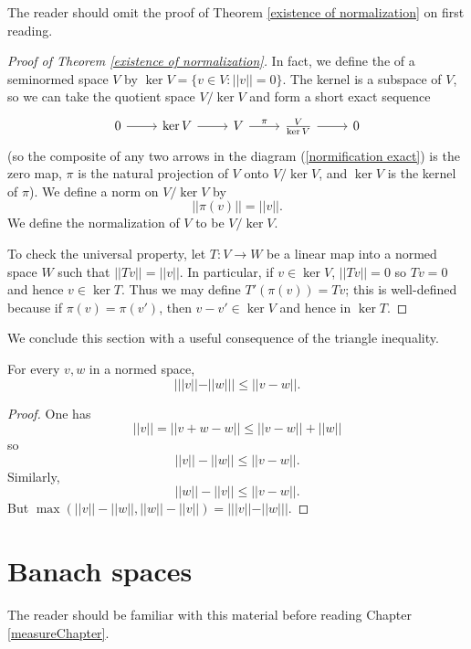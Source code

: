 The reader should omit the proof of Theorem \ref{existence of normalization} on first reading.
\begin{proof}[Proof of Theorem \ref{existence of normalization}]
In fact, we define the  of a seminormed space $V$ by $\ker V = \{v \in V: ||v|| = 0\}$.
The kernel is a subspace of $V$, so we can take the quotient space $V/\ker V$ and form a short exact sequence
\begin{equation}
\label{normification exact}
\begin{tikzcd}
0 \arrow[r] & \ker V \arrow[r] & V \arrow[r,"\pi"] & \frac{V}{\ker V} \arrow[r] & 0
\end{tikzcd}
\end{equation}
(so the composite of any two arrows in the diagram (\ref{normification exact}) is the zero map, $\pi$ is the natural projection of $V$ onto $V/\ker V$, and $\ker V$ is the kernel of $\pi$).
We define a norm on $V/\ker V$ by
$$||\pi(v)|| = ||v||.$$
We define the normalization of $V$ to be $V/\ker V$.

To check the universal property, let $T: V \to W$ be a linear map into a normed space $W$ such that $||Tv|| = ||v||$.
In particular, if $v \in \ker V$, $||Tv|| = 0$ so $Tv = 0$ and hence $v \in \ker T$.
Thus we may define $T'(\pi(v)) = Tv$; this is well-defined because if $\pi(v) = \pi(v')$, then $v - v' \in \ker V$ and hence in $\ker T$.
\end{proof}

We conclude this section with a useful consequence of the triangle inequality.
\begin{lemma}
For every $v, w$ in a normed space,
$$|||v|| - ||w||| \leq ||v - w||.$$
\end{lemma}
\begin{proof}
One has
$$||v|| = ||v + w - w|| \leq ||v - w|| + ||w||$$
so
$$||v|| - ||w|| \leq ||v - w||.$$
Similarly,
$$||w|| - ||v|| \leq ||v - w||.$$
But $\max(||v|| - ||w||, ||w|| - ||v||) = |||v|| - ||w|||$.
\end{proof}

\section{Banach spaces}
\label{Banach space appendix}
The reader should be familiar with this material before reading Chapter \ref{measureChapter}.

